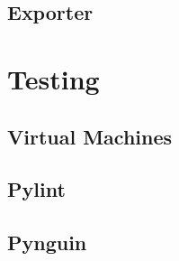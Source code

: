 \subsection{Exporter}


\section{Testing}
\subsection{Virtual Machines}
% 

\subsection{Pylint}
% 

\subsection{Pynguin}
% 